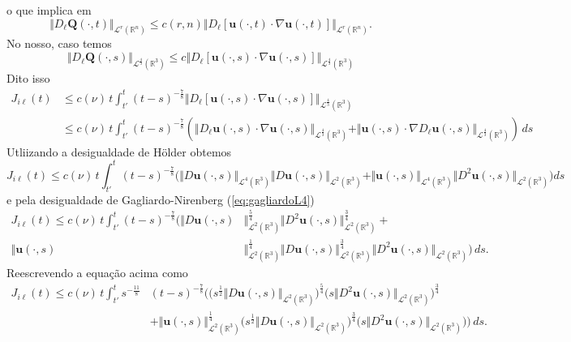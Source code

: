 \documentclass[a4paper, 11pt]{book}
\theoremstyle{definition}
\newcommand{\bR}{\mathbb{R}}
\newcommand{\bu}{\mathbf{u}}
\newcommand{\BQ}{\mathbf{Q}}
\newcommand{\cL}{\mathcal{L}}
\begin{document}
\begin{prf}
{\[        \]
        o que implica em
        \[
            \Vert D_\ell \BQ(\cdot,t) \Vert_{\cL^r(\bR^n)} \leqslant c(r,n) \Vert D_\ell[\bu(\cdot,t) \cdot \nabla\bu(\cdot,t)] \Vert_{\cL^r(\bR^n)}.  
        \]
        No nosso, caso temos
        \[
            \Vert D_\ell\BQ(\cdot,s) \Vert_{\cL^\frac{4}{3}(\bR^3)} \leqslant c \Vert D_{\ell} [\bu(\cdot,s) \cdot \nabla \bu(\cdot,s)] \Vert_{\cL^{\frac{4}{3}}(\bR^3)}
        \]
    }\!Dito isso
    \[
        \begin{aligned}
            J_{i\ell}(t) &\leqslant c(\nu) \, t \int_{t'}^t (t - s)^{-\frac{7}{8}} \Vert D_\ell [\bu(\cdot,s) \cdot \nabla \bu(\cdot,s)] \Vert_{\cL^\frac{4}{3}(\bR^3)}\\
            &\leqslant c(\nu) \, t \int_{t'}^t (t - s)^{-\frac{7}{8}} \left( \Vert D_{\ell} \bu(\cdot,s) \cdot \nabla \bu(\cdot,s) \Vert_{\cL^\frac{4}{3}(\bR^3)} + \Vert \bu(\cdot,s) \cdot \nabla D_\ell \bu(\cdot,s) \Vert_{\cL^\frac{4}{3}(\bR^3)} \right) \,ds 
        \end{aligned}
    \]
    Utliizando a desigualdade de Hölder obtemos
    \[
        J_{i\ell}(t) \leqslant c(\nu) \, t \! \int_{t'}^t \! (t - s)^{-\frac{7}{8}} \Big( \Vert D\bu(\cdot,s) \Vert_{\cL^4(\bR^3)} \Vert D\bu(\cdot,s) \Vert_{\cL^2(\bR^3)}+ \Vert \bu(\cdot,s) \Vert_{\cL^4(\bR^3)} \Vert D^2\bu(\cdot,s) \Vert_{\cL^2(\bR^3)} \Big) ds
    \]
    e pela desigualdade de Gagliardo-Nirenberg (\ref{eq:gagliardoL4})
    \[
        \begin{aligned}
            J_{i\ell}(t) \leqslant c(\nu) \, t \int_{t'}^t  (t - s)^{-\frac{7}{8}} \Big( \Vert D\bu(\cdot,s) &\Vert_{\cL^2(\bR^3)}^{\frac{5}{4}} \Vert D^2\bu(\cdot,s) \Vert_{\cL^2(\bR^3)}^{\frac{3}{4}} +\\ \Vert \bu(\cdot,s) &\Vert_{\cL^2(\bR^3)}^{\frac{1}{4}} \Vert D\bu(\cdot,s) \Vert_{\cL^2(\bR^3)}^{\frac{3}{4}} \Vert D^2\bu(\cdot,s) \Vert_{\cL^2(\bR^3)} \Big) \, ds.
        \end{aligned}
    \]
    Reescrevendo a equação acima como
    \[
        \begin{aligned}
            J_{i\ell}(t) \leqslant c(\nu) \, t \int_{t'}^t s^{-\frac{11}{8}} &(t - s)^{-\frac{7}{8}} \Big( \big(s^{\frac{1}{2}}\Vert D\bu(\cdot,s) \Vert_{\cL^2(\bR^3)} \big)^{\frac{5}{4}} \big( s\Vert D^2\bu(\cdot,s) \Vert_{\cL^2(\bR^3)}\big)^{\frac{3}{4}}\\ &+ \Vert \bu(\cdot,s) \Vert_{\cL^2(\bR^3)}^{\frac{1}{4}} \big( s^{\frac{1}{2}}\Vert D\bu(\cdot,s) \Vert_{\cL^2(\bR^3)}\big)^{\frac{3}{4}} \big(s\Vert D^2\bu(\cdot,s) \Vert_{\cL^2(\bR^3)}\big) \Big) \, ds.

\end{aligned}\]
\end{prf}
\end{document}
